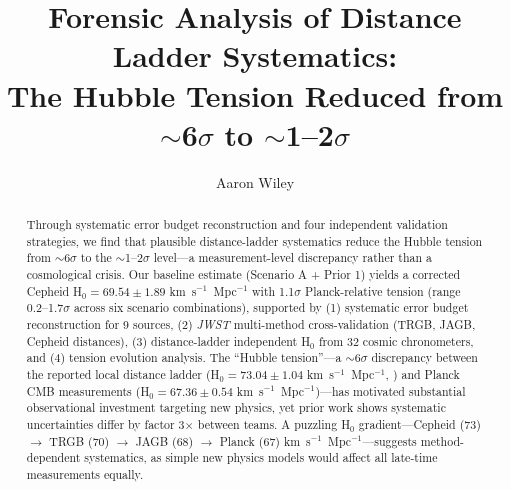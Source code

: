 \documentclass[preprint, linenumbers]{aastex701}
\providecommand{\orcid}[1]{}
\begin{document}
\title{Forensic Analysis of Distance Ladder Systematics: \\
The Hubble Tension Reduced from $\sim$6$\sigma$ to $\sim$1--2$\sigma$}

\author{Aaron Wiley}
\orcid{0009-0007-1612-9203}



\begin{abstract}

Through systematic error budget reconstruction and four independent validation strategies, we find that plausible distance-ladder systematics reduce the Hubble tension from $\sim$6$\sigma$ to the $\sim$1--2$\sigma$ level---a measurement-level discrepancy rather than a cosmological crisis. Our baseline estimate (Scenario A + Prior 1) yields a corrected Cepheid H$_0 = 69.54 \pm 1.89$ km~s$^{-1}$~Mpc$^{-1}$ with 1.1$\sigma$ Planck-relative tension (range 0.2--1.7$\sigma$ across six scenario combinations), supported by (1) systematic error budget reconstruction for 9 sources, (2) \textit{JWST} multi-method cross-validation (TRGB, JAGB, Cepheid distances), (3) distance-ladder independent H$_0$ from 32 cosmic chronometers, and (4) tension evolution analysis. The ``Hubble tension''---a $\sim$6$\sigma$ discrepancy between the reported local distance ladder (H$_0 = 73.04 \pm 1.04$ km~s$^{-1}$~Mpc$^{-1}$, \citealt{Riess2022}) and Planck CMB measurements (H$_0 = 67.36 \pm 0.54$ km~s$^{-1}$~Mpc$^{-1}$)---has motivated substantial observational investment targeting new physics, yet prior work shows systematic uncertainties differ by factor 3$\times$ between teams. A puzzling H$_0$ gradient---Cepheid (73) $\rightarrow$ TRGB (70) $\rightarrow$ JAGB (68) $\rightarrow$ Planck (67) km~s$^{-1}$~Mpc$^{-1}$---suggests method-dependent systematics, as simple new physics models would affect all late-time measurements equally.


\end{abstract}
\end{document}
